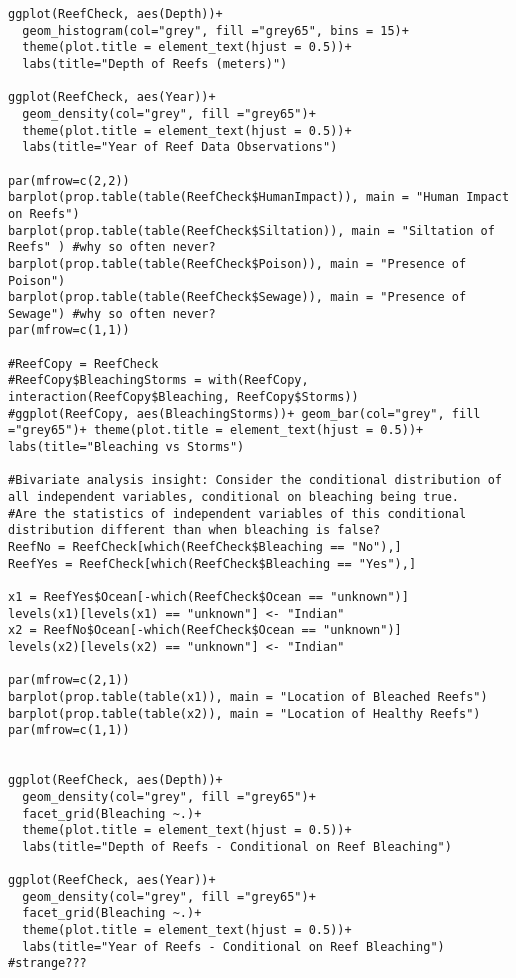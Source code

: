 \documentclass{article}
\begin{document}
\begin{verbatim}
ggplot(ReefCheck, aes(Depth))+
  geom_histogram(col="grey", fill ="grey65", bins = 15)+
  theme(plot.title = element_text(hjust = 0.5))+
  labs(title="Depth of Reefs (meters)")

ggplot(ReefCheck, aes(Year))+
  geom_density(col="grey", fill ="grey65")+
  theme(plot.title = element_text(hjust = 0.5))+
  labs(title="Year of Reef Data Observations")

par(mfrow=c(2,2))
barplot(prop.table(table(ReefCheck$HumanImpact)), main = "Human Impact on Reefs")
barplot(prop.table(table(ReefCheck$Siltation)), main = "Siltation of Reefs" ) #why so often never?
barplot(prop.table(table(ReefCheck$Poison)), main = "Presence of Poison")
barplot(prop.table(table(ReefCheck$Sewage)), main = "Presence of Sewage") #why so often never?
par(mfrow=c(1,1))

#ReefCopy = ReefCheck
#ReefCopy$BleachingStorms = with(ReefCopy, interaction(ReefCopy$Bleaching, ReefCopy$Storms))
#ggplot(ReefCopy, aes(BleachingStorms))+ geom_bar(col="grey", fill ="grey65")+ theme(plot.title = element_text(hjust = 0.5))+  labs(title="Bleaching vs Storms")

#Bivariate analysis insight: Consider the conditional distribution of all independent variables, conditional on bleaching being true. 
#Are the statistics of independent variables of this conditional distribution different than when bleaching is false?
ReefNo = ReefCheck[which(ReefCheck$Bleaching == "No"),]
ReefYes = ReefCheck[which(ReefCheck$Bleaching == "Yes"),]

x1 = ReefYes$Ocean[-which(ReefCheck$Ocean == "unknown")]
levels(x1)[levels(x1) == "unknown"] <- "Indian"
x2 = ReefNo$Ocean[-which(ReefCheck$Ocean == "unknown")]
levels(x2)[levels(x2) == "unknown"] <- "Indian"

par(mfrow=c(2,1))
barplot(prop.table(table(x1)), main = "Location of Bleached Reefs")
barplot(prop.table(table(x2)), main = "Location of Healthy Reefs")
par(mfrow=c(1,1))


ggplot(ReefCheck, aes(Depth))+
  geom_density(col="grey", fill ="grey65")+
  facet_grid(Bleaching ~.)+
  theme(plot.title = element_text(hjust = 0.5))+
  labs(title="Depth of Reefs - Conditional on Reef Bleaching")

ggplot(ReefCheck, aes(Year))+
  geom_density(col="grey", fill ="grey65")+
  facet_grid(Bleaching ~.)+
  theme(plot.title = element_text(hjust = 0.5))+
  labs(title="Year of Reefs - Conditional on Reef Bleaching") #strange???


\end{verbatim}
\end{document}
